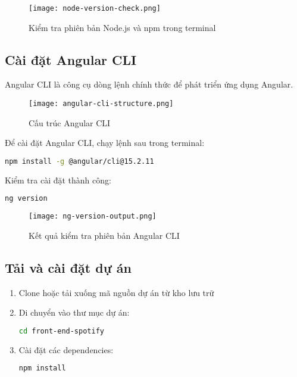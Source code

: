 \documentclass[12pt,a4paper]{article}
\begin{document}
\begin{figure}[h]
\centering
\texttt{[image: node-version-check.png]}
\caption{Kiểm tra phiên bản Node.js và npm trong terminal}
\end{figure}

\subsection{Cài đặt Angular CLI}

Angular CLI là công cụ dòng lệnh chính thức để phát triển ứng dụng Angular.

\begin{figure}[h]
\centering
\texttt{[image: angular-cli-structure.png]}
\caption{Cấu trúc Angular CLI}
\end{figure}

Để cài đặt Angular CLI, chạy lệnh sau trong terminal:

\begin{lstlisting}[language=bash]
npm install -g @angular/cli@15.2.11
\end{lstlisting}

Kiểm tra cài đặt thành công:

\begin{lstlisting}[language=bash]
ng version
\end{lstlisting}

\begin{figure}[h]
\centering
\texttt{[image: ng-version-output.png]}
\caption{Kết quả kiểm tra phiên bản Angular CLI}
\end{figure}

\subsection{Tải và cài đặt dự án}

\begin{enumerate}
  \item Clone hoặc tải xuống mã nguồn dự án từ kho lưu trữ
  \item Di chuyển vào thư mục dự án:
  \begin{lstlisting}[language=bash]
  cd front-end-spotify
  \end{lstlisting}
  \item Cài đặt các dependencies:
  \begin{lstlisting}[language=bash]
  npm install
  \end{lstlisting}
\end{enumerate}
\end{document}

